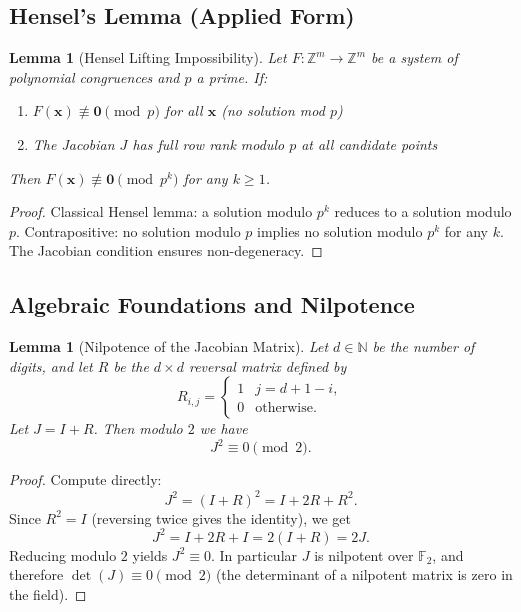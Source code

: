 \documentclass[11pt,a4paper]{article}
\theoremstyle{plain}
\newtheorem{lemma}[theorem]{Lemma}
\theoremstyle{definition}
\newcommand{\Z}{\mathbb{Z}}
\newcommand{\F}{\mathbb{F}}
\begin{document}
\subsection{Hensel's Lemma (Applied Form)}

\begin{lemma}[Hensel Lifting Impossibility]\label{lem:hensel}
Let $F: \Z^m \to \Z^m$ be a system of polynomial congruences and $p$ a prime. If:
\begin{enumerate}
\item $F(\mathbf{x}) \not\equiv \mathbf{0} \pmod{p}$ for all $\mathbf{x}$ (no solution mod $p$)
\item The Jacobian $J$ has full row rank modulo $p$ at all candidate points
\end{enumerate}
Then $F(\mathbf{x}) \not\equiv \mathbf{0} \pmod{p^k}$ for any $k \geq 1$.
\end{lemma}

\begin{proof}
Classical Hensel lemma: a solution modulo $p^k$ reduces to a solution modulo $p$. Contrapositive: no solution modulo $p$ implies no solution modulo $p^k$ for any $k$. The Jacobian condition ensures non-degeneracy.
\end{proof}

\subsection{Algebraic Foundations and Nilpotence}

\begin{lemma}[Nilpotence of the Jacobian Matrix]\label{lem:nilpotence_J}
Let $d \in \mathbb{N}$ be the number of digits, and let $R$ be the $d \times d$ reversal matrix defined by
\[ R_{i,j} = \begin{cases}1 & j = d + 1 - i, \\ 0 & \text{otherwise.}\end{cases}\]
Let $J = I + R$. Then modulo $2$ we have
\[ J^2 \equiv 0 \pmod{2}. \]
\end{lemma}

\begin{proof}
Compute directly:
\[
J^2 = (I + R)^2 = I + 2R + R^2.
\]
Since $R^2 = I$ (reversing twice gives the identity), we get
\[
J^2 = I + 2R + I = 2(I + R) = 2J.
\]
Reducing modulo $2$ yields $J^2 \equiv 0$. In particular $J$ is nilpotent over $\F_2$, and therefore $\det(J) \equiv 0 \pmod{2}$ (the determinant of a nilpotent matrix is zero in the field).
\end{proof}
\end{document}
